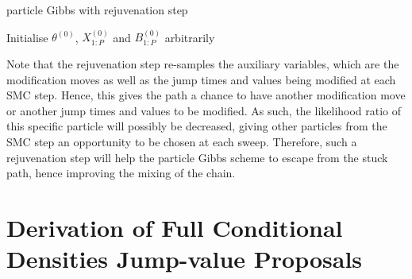 \documentclass[12pt,a4paper]{article}
\begin{document}
\begin{algorithm}[htb!]
    \caption{particle Gibbs with rejuvenation step}
            Initialise $\theta^{(0)}$, $X_{1:P}^{(0)}$ and $B_{1:P}^{(0)}$ arbitrarily\;
    \label{particle Gibbs-rejuvenation}
\end{algorithm}

Note that the rejuvenation step re-samples the auxiliary variables, which are the modification moves as well as the jump times and values being modified at each SMC step. Hence, this gives the path a chance to have another modification move or another jump times and values to be modified. As such, the likelihood ratio of this specific particle will possibly be decreased, giving other particles from the SMC step an opportunity to be chosen at each sweep. Therefore, such a rejuvenation step will help the particle Gibbs scheme to escape from the stuck path, hence improving the mixing of the chain. 
\section{Derivation of Full Conditional Densities Jump-value Proposals}



\end{document}
